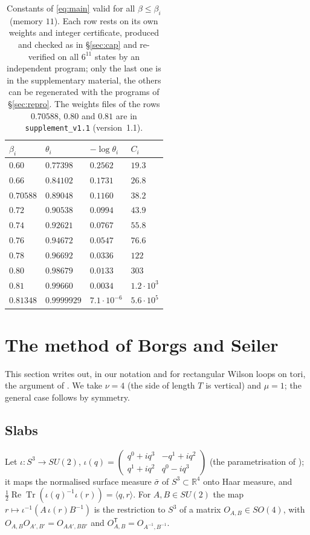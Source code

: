 \documentclass[11pt,a4paper]{article}
\theoremstyle{plain}
\theoremstyle{remark}
\numberwithin{equation}{section}
\newcommand{\R}{\mathbb{R}}
\newcommand{\ReTr}{\operatorname{Re}\operatorname{Tr}}
\begin{document}
\begin{table}[ht]
\centering\small
\begin{tabular}{@{}llll@{}}
\toprule
$\beta_i$ & $\theta_i$ & $-\log\theta_i$ & $C_i$\\
\midrule
$0.60$ & $0.77398$ & $0.2562$ & $19.3$\\
$0.66$ & $0.84102$ & $0.1731$ & $26.8$\\
$0.70588$ & $0.89048$ & $0.1160$ & $38.2$\\
$0.72$ & $0.90538$ & $0.0994$ & $43.9$\\
$0.74$ & $0.92621$ & $0.0767$ & $55.8$\\
$0.76$ & $0.94672$ & $0.0547$ & $76.6$\\
$0.78$ & $0.96692$ & $0.0336$ & $122$\\
$0.80$ & $0.98679$ & $0.0133$ & $303$\\
$0.81$ & $0.99660$ & $0.0034$ & $1.2\cdot10^{3}$\\
$0.81348$ & $0.9999929$ & $7.1\cdot10^{-6}$ & $5.6\cdot10^{5}$\\
\bottomrule
\end{tabular}
\caption{Constants of \eqref{eq:main} valid for all $\beta\le\beta_i$ (memory $11$). Each row rests on its own weights and integer
certificate, produced and checked as in \S\ref{sec:cap} and re-verified on all $6^{11}$ states by an independent program; only the
last one is in the supplementary material, the others can be regenerated with the programs of \S\ref{sec:repro}. The weights files
of the rows $0.70588$, $0.80$ and $0.81$ are in \texttt{supplement\_v1.1} (version~1.1).}
\label{tab:tension}
\end{table}

\section{The method of Borgs and Seiler}\label{sec:bs}

This section writes out, in our notation and for rectangular Wilson loops on tori, the argument of \cite[Appendix~B]{BS83}. We take
$\nu=4$ (the side of length $T$ is vertical) and $\mu=1$; the general case follows by symmetry.

\subsection{Slabs}
Let $\iota:S^3\to SU(2)$, $\iota(q)=\begin{pmatrix}q^0+iq^3&-q^1+iq^2\\ q^1+iq^2&q^0-iq^3\end{pmatrix}$ (the parametrisation of
\cite[(5.1)]{DF80}); it maps the normalised surface measure $\bar\sigma$ of $S^3\subset\R^4$ onto Haar measure, and
$\frac12\ReTr(\iota(q)^{-1}\iota(r))=\langle q,r\rangle$. For $A,B\in SU(2)$ the map $r\mapsto\iota^{-1}(A\,\iota(r)B^{-1})$ is the
restriction to $S^3$ of a matrix $O_{A,B}\in SO(4)$, with $O_{A,B}O_{A',B'}=O_{AA',BB'}$ and $O_{A,B}^{\mathsf T}=O_{A^{-1},B^{-1}}$.
\end{document}
